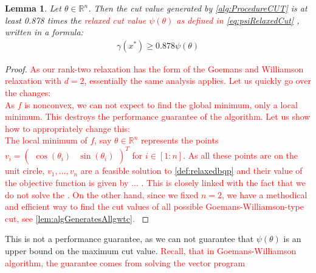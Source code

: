 \documentclass[12pt,a4paper]{article}
\theoremstyle{mythm}
\newtheorem{lem}[thm]{Lemma}
\begin{document}
\begin{lem}
Let $ \theta \in \mathbb{R} ^{ n }  $. Then the cut value generated by \ref{alg:ProcedureCUT} is at least 0.878 times the \textcolor{red}{relaxed cut value $ \psi (\theta) $ as defined in
\ref{eq:psiRelaxedCut} }, written in a formula:
\begin{align}
\label{eq:perfguarantee} 
\gamma (x^*) \geq 0.878 \psi (\theta) 
\end{align} 
\end{lem} 
\begin{proof}
\textcolor{red}{As our rank-two relaxation has the form of the Goemans and Williamson relaxation with $ d=2 $, essentially the same analysis applies.}
\textcolor{red}{Let us quickly go over the changes: \\
As $ f $ is nonconvex, we can not expect to find the global minimum, only a local minimum.
This destroys the performance guarantee of the algorithm.
Let us show how to appropriately change this: \\
The local minimum of $ f $, say $ \theta \in \mathbb{R} ^{ n } $ represents the points 
$
v_i =
\begin{pmatrix}
\cos( \theta_i ) &
\sin( \theta_i ) 
\end{pmatrix} ^{ T }  
$ for $ i \in \left[ 1:n \right]  $.
As all these points are on the unit circle, $ v_1 , \dots, v_n $ are a feasible solution to \ref{def:relaxedbqp} and their value of the objective function is given by ...
.
This is closely linked with the fact that we do not solve the \SDP.
On the other hand, since we fixed $ n = 2 $, we have a methodical and efficient way to find the cut values of all possible Goemans-Williamson-type cut, see
\ref{lem:algGeneratesAllgwtc}.
}
\end{proof}
This is not a performance guarantee, as we can not guarantee that $ \psi ( \theta)  $ is an upper bound on the maximum cut value.
\textcolor{red}{Recall, that in Goemans-Williamson algorithm, the guarantee comes from solving the \textcolor{red}{vector program}}
\end{document}
